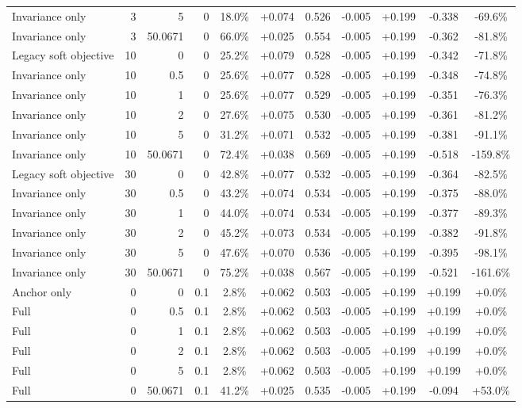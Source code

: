 \begin{table}[htbp]
\begin{tabular}{lrrrccccccc}
Invariance only & 3 & 5 & 0 & 18.0\% & +0.074 & 0.526 & -0.005 & +0.199 & -0.338 & -69.6\% \\
Invariance only & 3 & 50.0671 & 0 & 66.0\% & +0.025 & 0.554 & -0.005 & +0.199 & -0.362 & -81.8\% \\
Legacy soft objective & 10 & 0 & 0 & 25.2\% & +0.079 & 0.528 & -0.005 & +0.199 & -0.342 & -71.8\% \\
Invariance only & 10 & 0.5 & 0 & 25.6\% & +0.077 & 0.528 & -0.005 & +0.199 & -0.348 & -74.8\% \\
Invariance only & 10 & 1 & 0 & 25.6\% & +0.077 & 0.529 & -0.005 & +0.199 & -0.351 & -76.3\% \\
Invariance only & 10 & 2 & 0 & 27.6\% & +0.075 & 0.530 & -0.005 & +0.199 & -0.361 & -81.2\% \\
Invariance only & 10 & 5 & 0 & 31.2\% & +0.071 & 0.532 & -0.005 & +0.199 & -0.381 & -91.1\% \\
Invariance only & 10 & 50.0671 & 0 & 72.4\% & +0.038 & 0.569 & -0.005 & +0.199 & -0.518 & -159.8\% \\
Legacy soft objective & 30 & 0 & 0 & 42.8\% & +0.077 & 0.532 & -0.005 & +0.199 & -0.364 & -82.5\% \\
Invariance only & 30 & 0.5 & 0 & 43.2\% & +0.074 & 0.534 & -0.005 & +0.199 & -0.375 & -88.0\% \\
Invariance only & 30 & 1 & 0 & 44.0\% & +0.074 & 0.534 & -0.005 & +0.199 & -0.377 & -89.3\% \\
Invariance only & 30 & 2 & 0 & 45.2\% & +0.073 & 0.534 & -0.005 & +0.199 & -0.382 & -91.8\% \\
Invariance only & 30 & 5 & 0 & 47.6\% & +0.070 & 0.536 & -0.005 & +0.199 & -0.395 & -98.1\% \\
Invariance only & 30 & 50.0671 & 0 & 75.2\% & +0.038 & 0.567 & -0.005 & +0.199 & -0.521 & -161.6\% \\
Anchor only & 0 & 0 & 0.1 & 2.8\% & +0.062 & 0.503 & -0.005 & +0.199 & +0.199 & +0.0\% \\
Full & 0 & 0.5 & 0.1 & 2.8\% & +0.062 & 0.503 & -0.005 & +0.199 & +0.199 & +0.0\% \\
Full & 0 & 1 & 0.1 & 2.8\% & +0.062 & 0.503 & -0.005 & +0.199 & +0.199 & +0.0\% \\
Full & 0 & 2 & 0.1 & 2.8\% & +0.062 & 0.503 & -0.005 & +0.199 & +0.199 & +0.0\% \\
Full & 0 & 5 & 0.1 & 2.8\% & +0.062 & 0.503 & -0.005 & +0.199 & +0.199 & +0.0\% \\
Full & 0 & 50.0671 & 0.1 & 41.2\% & +0.025 & 0.535 & -0.005 & +0.199 & -0.094 & +53.0\% \\

\end{tabular}
\end{table}

